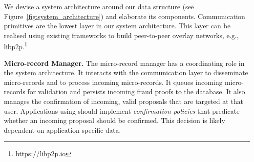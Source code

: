 
We devise a system architecture around our \ModelName{} data structure (see Figure~\ref{fig:system_architecture}) and elaborate its components.
Communication primitives are the lowest layer in our system architecture.
This layer can be realised using existing frameworks to build peer-to-peer overlay networks, e.g., libp2p.\footnote{https://libp2p.io}

\textbf{Micro-record Manager.}
The micro-record manager has a coordinating role in the \ModelName{} system architecture.
It interacts with the communication layer to disseminate micro-records and to process incoming micro-records.
It queues incoming micro-records for validation and persists incoming fraud proofs to the database.
It also manages the confirmation of incoming, valid proposals that are targeted at that user.
Applications using \ModelName{} should implement \emph{confirmation policies} that predicate whether an incoming proposal should be confirmed.
This decision is likely dependent on application-specific data.

